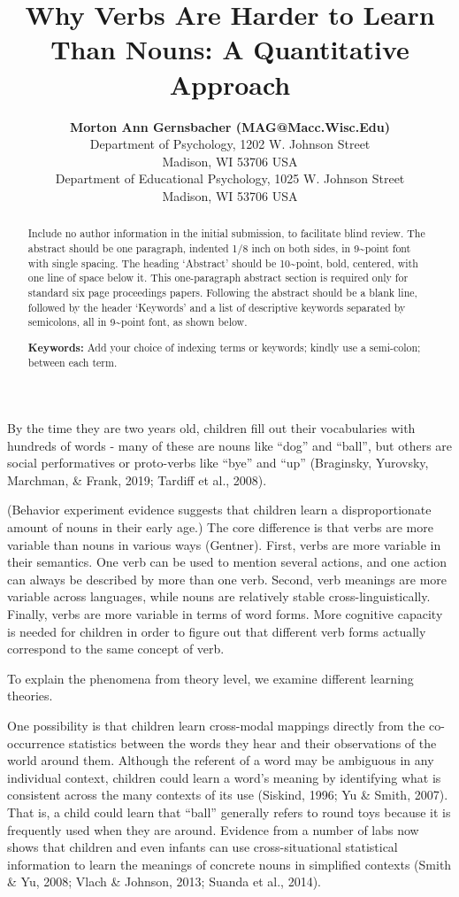 \documentclass[10pt, letterpaper]{article}
\title{Why Verbs Are Harder to Learn Than Nouns: A Quantitative Approach}
\author{{\large \bf Morton Ann Gernsbacher (MAG@Macc.Wisc.Edu)} \\ Department of Psychology, 1202 W. Johnson Street \\ Madison, WI 53706 USA \AND {\large \bf Sharon J.~Derry (SDJ@Macc.Wisc.Edu)} \\ Department of Educational Psychology, 1025 W. Johnson Street \\ Madison, WI 53706 USA}
\begin{document}
\maketitle

\begin{abstract}
Include no author information in the initial submission, to facilitate
blind review. The abstract should be one paragraph, indented 1/8 inch on
both sides, in 9\textasciitilde point font with single spacing. The
heading `Abstract' should be 10\textasciitilde point, bold, centered,
with one line of space below it. This one-paragraph abstract section is
required only for standard six page proceedings papers. Following the
abstract should be a blank line, followed by the header `Keywords' and a
list of descriptive keywords separated by semicolons, all in
9\textasciitilde point font, as shown below.

\textbf{Keywords:}
Add your choice of indexing terms or keywords; kindly use a semi-colon;
between each term.
\end{abstract}

By the time they are two years old, children fill out their vocabularies
with hundreds of words - many of these are nouns like ``dog'' and
``ball'', but others are social performatives or proto-verbs like
``bye'' and ``up'' (Braginsky, Yurovsky, Marchman, \& Frank, 2019;
Tardiff et al., 2008).

(Behavior experiment evidence suggests that children learn a
disproportionate amount of nouns in their early age.) The core
difference is that verbs are more variable than nouns in various ways
(Gentner). First, verbs are more variable in their semantics. One verb
can be used to mention several actions, and one action can always be
described by more than one verb. Second, verb meanings are more variable
across languages, while nouns are relatively stable
cross-linguistically. Finally, verbs are more variable in terms of word
forms. More cognitive capacity is needed for children in order to figure
out that different verb forms actually correspond to the same concept of
verb.

To explain the phenomena from theory level, we examine different
learning theories.

One possibility is that children learn cross-modal mappings directly
from the co-occurrence statistics between the words they hear and their
observations of the world around them. Although the referent of a word
may be ambiguous in any individual context, children could learn a
word's meaning by identifying what is consistent across the many
contexts of its use (Siskind, 1996; Yu \& Smith, 2007). That is, a child
could learn that ``ball'' generally refers to round toys because it is
frequently used when they are around. Evidence from a number of labs now
shows that children and even infants can use cross-situational
statistical information to learn the meanings of concrete nouns in
simplified contexts (Smith \& Yu, 2008; Vlach \& Johnson, 2013; Suanda
et al., 2014).
\end{document}
